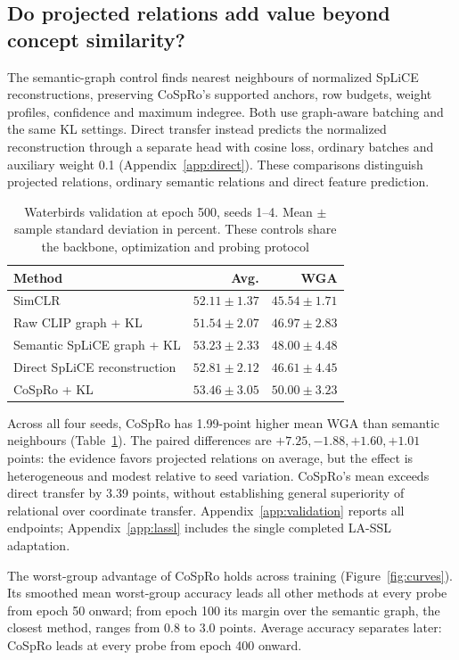 \documentclass{article}
\begin{document}
\subsection{Do projected relations add value beyond concept similarity?}
The semantic-graph control finds nearest neighbours of normalized SpLiCE reconstructions, preserving CoSpRo's supported anchors, row budgets, weight profiles, confidence and maximum indegree. Both use graph-aware batching and the same KL settings. Direct transfer instead predicts the normalized reconstruction through a separate head with cosine loss, ordinary batches and auxiliary weight 0.1 (Appendix~\ref{app:direct}). These comparisons distinguish projected relations, ordinary semantic relations and direct feature prediction.

\begin{table}[htbp]
\centering
\caption{Waterbirds validation at epoch 500, seeds 1--4. Mean $\pm$ sample standard deviation in percent. These controls share the backbone, optimization and probing protocol}
\begin{tabular}{lrr}
\toprule
Method & Avg. & WGA \\
\midrule
SimCLR & $52.11\pm1.37$ & $45.54\pm1.71$ \\
Raw CLIP graph + KL & $51.54\pm2.07$ & $46.97\pm2.83$ \\
Semantic SpLiCE graph + KL & $53.23\pm2.33$ & $48.00\pm4.48$ \\
Direct SpLiCE reconstruction & $52.81\pm2.12$ & $46.61\pm4.45$ \\
CoSpRo + KL & $53.46\pm3.05$ & $50.00\pm3.23$ \\
\bottomrule
\end{tabular}
\label{tab:semantic}
\end{table}

Across all four seeds, CoSpRo has 1.99-point higher mean WGA than semantic neighbours (Table~\ref{tab:semantic}). The paired differences are $+7.25,-1.88,+1.60,+1.01$ points: the evidence favors projected relations on average, but the effect is heterogeneous and modest relative to seed variation. CoSpRo's mean exceeds direct transfer by 3.39 points, without establishing general superiority of relational over coordinate transfer. Appendix~\ref{app:validation} reports all endpoints; Appendix~\ref{app:lassl} includes the single completed LA-SSL adaptation.

The worst-group advantage of CoSpRo holds across training (Figure~\ref{fig:curves}). Its smoothed mean worst-group accuracy leads all other methods at every probe from epoch 50 onward; from epoch 100 its margin over the semantic graph, the closest method, ranges from 0.8 to 3.0 points. Average accuracy separates later: CoSpRo leads at every probe from epoch 400 onward.
\end{document}
